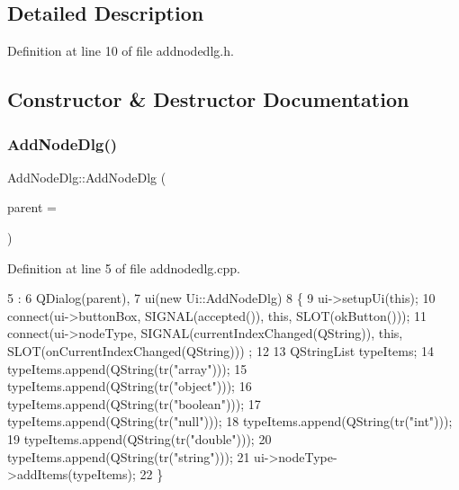 \subsection{Detailed Description}


Definition at line 10 of file addnodedlg.\+h.



\subsection{Constructor \& Destructor Documentation}
\mbox{\label{class_add_node_dlg_a4ec72774fa593b3478b30b93fc6bc66e}} 
\subsubsection{\texorpdfstring{Add\+Node\+Dlg()}{AddNodeDlg()}}
{\footnotesize\ttfamily Add\+Node\+Dlg\+::\+Add\+Node\+Dlg (\begin{DoxyParamCaption}\item[{Q\+Widget $\ast$}]{parent = {} }\end{DoxyParamCaption})}



Definition at line 5 of file addnodedlg.\+cpp.


\begin{DoxyCode}
5                                       :
6     QDialog(parent),
7     ui(\textcolor{keyword}{new} Ui::AddNodeDlg)
8 \{
9     ui->setupUi(\textcolor{keyword}{this});
10     connect(ui->buttonBox, SIGNAL(accepted()), \textcolor{keyword}{this}, SLOT(okButton()));
11     connect(ui->nodeType, SIGNAL(currentIndexChanged(QString)), \textcolor{keyword}{this}, SLOT(onCurrentIndexChanged(QString)))
      ;
12 
13     QStringList typeItems;
14     typeItems.append(QString(tr(\textcolor{stringliteral}{"array"})));
15     typeItems.append(QString(tr(\textcolor{stringliteral}{"object"})));
16     typeItems.append(QString(tr(\textcolor{stringliteral}{"boolean"})));
17     typeItems.append(QString(tr(\textcolor{stringliteral}{"null"})));
18     typeItems.append(QString(tr(\textcolor{stringliteral}{"int"})));
19     typeItems.append(QString(tr(\textcolor{stringliteral}{"double"})));
20     typeItems.append(QString(tr(\textcolor{stringliteral}{"string"})));
21     ui->nodeType->addItems(typeItems);
22 \}
\end{DoxyCode}
\mbox{\label{class_add_node_dlg_ac8fbcff62ff505714198a9318eca0c0f}} 
